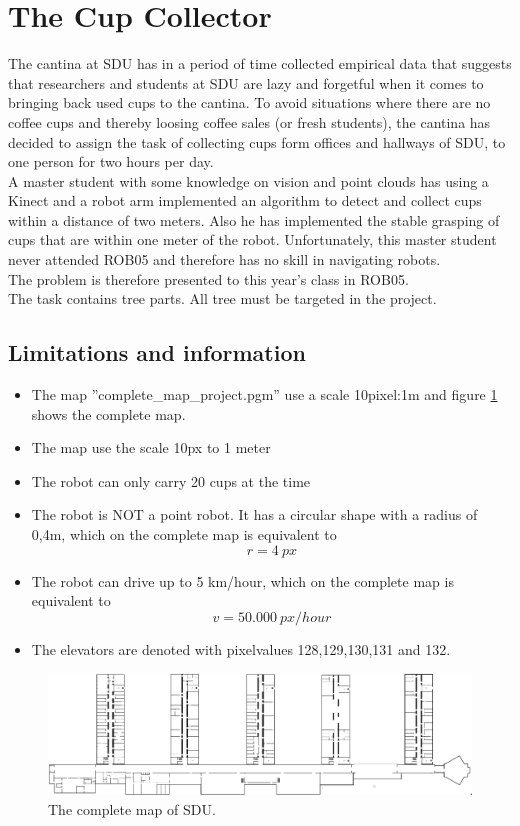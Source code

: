 \documentclass[11pt,a4paper]{article}
\begin{document}
\section{The Cup Collector}
The cantina at SDU has in a period of time collected empirical data that suggests that researchers and students at SDU are lazy and forgetful when it comes to bringing back used cups to the cantina. To avoid situations where there are no coffee cups and thereby loosing coffee sales (or fresh students), the cantina has decided to assign the task of collecting cups form offices and hallways of SDU, to one person for two hours per day.\\[0.2cm]
A master student with some knowledge on vision and point clouds has using a Kinect and a robot arm implemented an algorithm to detect and collect cups within a distance of two meters. Also he has implemented the stable grasping of cups that are within one meter of the robot. Unfortunately, this master student never attended ROB05 and therefore has no skill in navigating robots.\\[0.2cm]
The problem is therefore presented to this year’s class in ROB05.\\[0.2cm]
The task contains tree parts. All tree must be targeted in the project.

\subsection{Limitations and information}
\begin{itemize}
\item The map ”complete\_map\_project.pgm” use a scale 10pixel:1m and figure \ref{fig::original} shows the complete map. 
\item The map use the scale 10px to 1 meter
\item The robot can only carry 20 cups at the time
\item The robot is NOT a point robot. It has a circular shape with a radius of 0,4m, which on the complete map is equivalent to 
$$r=4\:px$$
\item The robot can drive up to 5 km/hour, which on the complete map is equivalent to
$$v=50.000\:px/hour$$
\item The elevators are denoted with pixelvalues 128,129,130,131 and 132.
\end{itemize}

\begin{figure}[H]
\centering
\includegraphics[scale=0.33]{img/original.png}
\caption{The complete map of SDU.}
\label{fig::original}
\end{figure}
\end{document}
